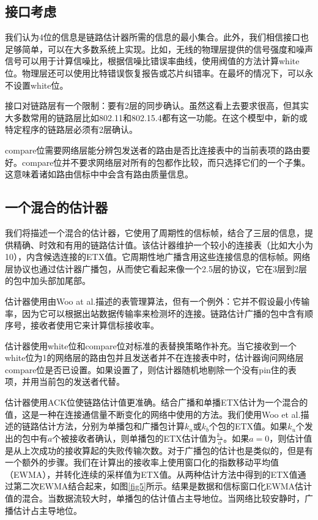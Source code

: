 \documentclass[12pt,a4paper]{article}
\begin{document}
\subsection{接口考虑}

我们认为4位的信息是链路估计器所需的信息的最小集合。此外，我们相信接口也足够简单，可以在大多数系统上实现。比如，无线的物理层提供的信号强度和噪声信号可以用于计算信噪比，根据信噪比错误率曲线，使用阀值的方法计算white位。物理层还可以使用比特错误恢复报告或芯片纠错率。在最坏的情况下，可以永不设置white位。

接口对链路层有一个限制：要有2层的同步确认。虽然这看上去要求很高，但其实大多数常用的链路层比如802.11和802.15.4都有这一功能。在这个模型中，新的或特定程序的链路层必须有2层确认。

compare位需要网络层能分辨包发送者的路由是否比连接表中的当前表项的路由要好。compare位并不要求网络层对所有的包都作比较，而只选择它们的一个子集。这意味着诸如路由信标中中会含有路由质量信息。

\subsection{一个混合的估计器}

我们将描述一个混合的估计器，它使用了周期性的信标帧，结合了三层的信息，提供精确、时效和有用的链路估计值。该估计器维护一个较小的连接表（比如大小为10），内含候选连接的ETX值。它周期性地广播含用这些连接信息的信标帧。网络层协议也通过估计器广播包，从而使它看起来像一个2.5层的协议，它在3层到2层的包中加头部加尾部。

估计器使用由Woo at al.描述的表管理算法，但有一个例外：它并不假设最小传输率，因为它可以根据出站数据传输率来检测坏的连接。链路估计广播的包中含有顺序号，接收者使用它来计算信标接收率。

估计器使用white位和compare位对标准的表替换策略作补充。当它接收到一个white位为1的网络层的路由包并且发送者并不在连接表中时，估计器询问网络层compare位是否已设置。如果设置了，则估计器随机地剔除一个没有pin住的表项，并用当前包的发送者代替。

估计器使用ACK位使链路估计值更准确。结合广播和单播ETX估计为一个混合的值，这是一种在连接通信量不断变化的网络中使用的方法。我们使用Woo et al.描述的链路估计方法，分别为单播包和广播包计算$k_u$或$k_b$个包的ETX值。如果$k_u$个发出的包中有$a$个被接收者确认，则单播包的ETX估计值为$\frac{k_u}{a}$。如果$a=0$，则估计值是从上次成功的接收算起的失败传输次数。对于广播包的估计也是类似的，但是有一个额外的步骤。我们在计算出的{\kai 接收率}上使用窗口化的指数移动平均值（EWMA），并转化连续的采样值为ETX值。从两种估计方法中得到的ETX值通过第二次EWMA结合起来，如图\ref{fig5}所示。结果是数据和信标窗口化EWMA估计值的混合。当数据流较大时，单播包的估计值占主导地位。当网络比较安静时，广播估计占主导地位。
\end{document}
